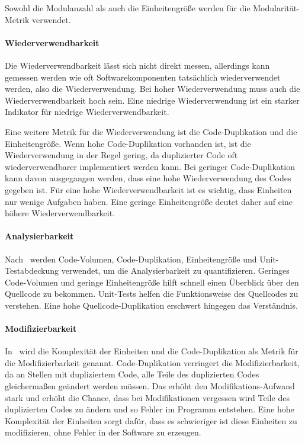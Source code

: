 \documentclass[12pt, a4paper, ngerman]{article}
\begin{document}
Sowohl die Modulanzahl als auch die Einheitengröße werden
für die Modularität-Metrik verwendet.

\paragraph{Wiederverwendbarkeit}

Die Wiederverwendbarkeit lässt sich nicht direkt messen,
allerdings kann gemessen werden wie oft Softwarekomponenten
tatsächlich wiederverwendet werden, also die Wiederverwendung.
Bei hoher Wiederverwendung muss auch die Wiederverwendbarkeit hoch sein.
Eine niedrige Wiederverwendung ist ein starker Indikator für niedrige Wiederverwendbarkeit.

Eine weitere Metrik für die Wiederverwendung ist die Code-Duplikation und die Einheitengröße.
Wenn hohe Code-Duplikation vorhanden ist, ist die Wiederverwendung in der Regel gering,
da duplizierter Code oft wiederverwendbarer implementiert werden kann.
Bei geringer Code-Duplikation kann davon ausgegangen werden,
dass eine hohe Wiederverwendung des Codes gegeben ist.
Für eine hohe Wiederverwendbarkeit ist es wichtig,
dass Einheiten nur wenige Aufgaben haben.
Eine geringe Einheitengröße deutet daher auf eine höhere Wiederverwendbarkeit.

\paragraph{Analysierbarkeit}

Nach~\cite{maintainability_metrics} werden Code-Volumen, Code-Duplikation, Einheitengröße
und Unit-Testabdeckung verwendet, um die Analysierbarkeit zu quantifizieren.
Geringes Code-Volumen und geringe Einheitengröße hilft
schnell einen Überblick über den Quellcode zu bekommen.
Unit-Tests helfen die Funktionsweise des Quellcodes zu verstehen.
Eine hohe Quellcode-Duplikation erschwert hingegen das Verständnis.

\paragraph{Modifizierbarkeit}

In~\cite{maintainability_metrics} wird die Komplexität der Einheiten und die Code-Duplikation
als Metrik für die Modifizierbarkeit genannt.
Code-Duplikation verringert die Modifizierbarkeit, da an Stellen mit dupliziertem Code,
alle Teile des duplizierten Codes gleichermaßen geändert werden müssen.
Das erhöht den Modifikations-Aufwand stark und erhöht die Chance,
dass bei Modifikationen vergessen wird Teile des duplizierten Codes zu ändern und so Fehler im Programm entstehen.
Eine hohe Komplexität der Einheiten sorgt dafür,
dass es schwieriger ist diese Einheiten zu modifizieren, ohne Fehler in der Software zu erzeugen.
\end{document}
